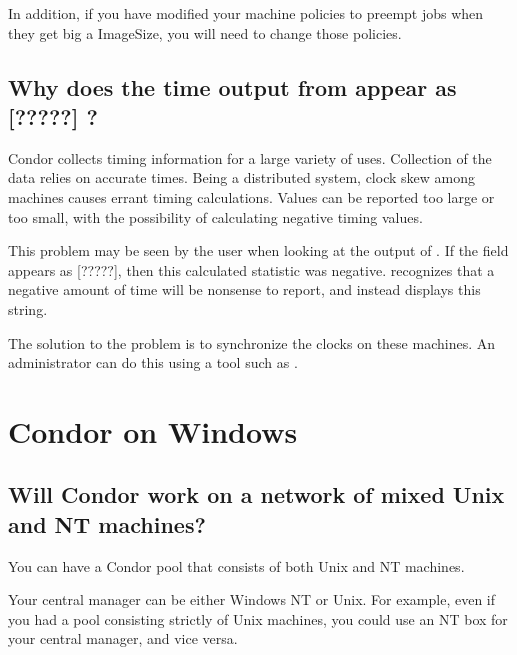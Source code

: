 In addition, if you have modified your machine policies to preempt
jobs when they get big a ImageSize, you will need to change those
policies.

\subsection*{Why does the time output from  appear
as [?????] ? }

Condor collects timing information for a large variety of uses.
Collection of the data relies on accurate times.
Being a distributed system, clock skew among machines causes 
errant timing calculations.
Values can be reported too large or too small, with the possibility
of calculating negative timing values.

This problem may be seen by the user when looking at the output
of .
If the  field appears
as [?????],
then this calculated statistic was negative.
 recognizes that a negative amount of time will
be nonsense to report, and instead displays this string. 

The solution to the problem is to synchronize the clocks on
these machines.
An administrator can do this using a tool such as .


\section{Condor on Windows}

\subsection*{Will Condor work on a network of mixed Unix and NT machines?}

You can have a Condor pool that consists of both Unix and NT machines.

Your central manager can be either Windows NT or Unix.  For example,
even if you had a pool consisting strictly of Unix machines, you could
use an NT box for your central manager, and vice versa.

